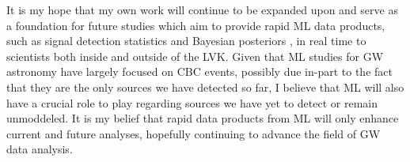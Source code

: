 It is my hope that my own work will continue to be expanded upon 
and serve as a foundation for future studies which aim to provide rapid \ac{ML} 
data products, such as signal detection statistics and Bayesian posteriors
, in real time to scientists both inside and outside of the \ac{LVK}. Given 
that \ac{ML} studies for \ac{GW} astronomy have largely focused 
on \ac{CBC} events, possibly due in-part to the fact that 
they are the only sources 
we have detected so far, I believe that \ac{ML} will also have a crucial role to 
play regarding sources we have yet to detect or remain unmoddeled. It is my 
belief that rapid data products from \ac{ML} will only 
enhance current and future analyses, hopefully 
continuing to advance the field of \ac{GW} data analysis.
